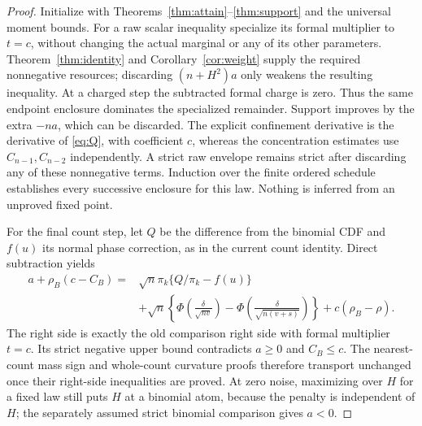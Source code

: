 \begin{proof}
Initialize with Theorems~\ref{thm:attain}--\ref{thm:support} and the
universal moment bounds. For a raw scalar inequality specialize its
formal multiplier to $t=c$, without changing the actual marginal or any
of its other parameters. Theorem~\ref{thm:identity} and
Corollary~\ref{cor:weight} supply the required nonnegative resources;
discarding $(n+H^2)a$ only weakens the resulting inequality. At a charged
step the subtracted formal charge is zero. Thus the same endpoint
enclosure dominates the specialized remainder. Support improves by the
extra $-na$, which can be discarded. The explicit confinement derivative
is the derivative of \eqref{eq:Q}, with coefficient $c$, whereas the
concentration estimates use $C_{n-1},C_{n-2}$ independently. A strict
raw envelope remains strict after discarding any of these nonnegative
terms. Induction over the finite ordered schedule establishes every
successive enclosure for this law. Nothing is inferred from an unproved
fixed point.

For the final count step, let $Q$ be the difference from the binomial
CDF and $f(u)$ its normal phase correction, as in the current count
identity. Direct subtraction yields
\begin{equation}\label{eq:transport-master}
 \begin{aligned}
 a+\rho_B(c-C_B)={}&\sqrt n\pi_k\{Q/\pi_k-f(u)\}\\
 &+\sqrt n\left\{\Phi\!\left(\frac{\delta}{\sqrt{nv}}\right)
  -\Phi\!\left(\frac{\delta}{\sqrt{n(v+s)}}\right)\right\}
 +c(\rho_B-\rho).
 \end{aligned}
\end{equation}
The right side is exactly the old comparison right side with formal
multiplier $t=c$. Its strict negative upper bound contradicts $a\ge0$
and $C_B\le c$. The nearest-count mass sign and whole-count curvature
proofs therefore transport unchanged once their right-side inequalities
are proved. At zero noise, maximizing over $H$ for a fixed law still
puts $H$ at a binomial atom, because the penalty is independent of $H$;
the separately assumed strict binomial comparison gives $a<0$.
\end{proof}

